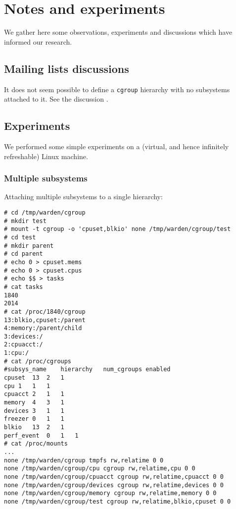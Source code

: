 \documentclass[a4paper,twoside,12pt]{article}
\begin{document}
\section{Notes and experiments}
\label{sec:notes}

We gather here some observations, experiments and discussions which have informed our research.

\subsection{Mailing lists discussions}

It does not seem possible to define a \texttt{cgroup} hierarchy with no subsystems attached to it.
See the discussion \cite{noop}.

\subsection{Experiments}
\label{sec:experiments}
We performed some simple experiments on a (virtual, and hence infinitely refreshable) Linux machine.

\subsubsection{Multiple subsystems}

Attaching multiple subsystems to a single hierarchy:
{\scriptsize \begin{verbatim}
# cd /tmp/warden/cgroup
# mkdir test
# mount -t cgroup -o 'cpuset,blkio' none /tmp/warden/cgroup/test
# cd test
# mkdir parent
# cd parent
# echo 0 > cpuset.mems
# echo 0 > cpuset.cpus
# echo $$ > tasks
# cat tasks
1840
2014
# cat /proc/1840/cgroup
13:blkio,cpuset:/parent
4:memory:/parent/child
3:devices:/
2:cpuacct:/
1:cpu:/
# cat /proc/cgroups
#subsys_name	hierarchy	num_cgroups	enabled
cpuset	13	2	1
cpu	1	1	1
cpuacct	2	1	1
memory	4	3	1
devices	3	1	1
freezer	0	1	1
blkio	13	2	1
perf_event	0	1	1
# cat /proc/mounts
...
none /tmp/warden/cgroup tmpfs rw,relatime 0 0
none /tmp/warden/cgroup/cpu cgroup rw,relatime,cpu 0 0
none /tmp/warden/cgroup/cpuacct cgroup rw,relatime,cpuacct 0 0
none /tmp/warden/cgroup/devices cgroup rw,relatime,devices 0 0
none /tmp/warden/cgroup/memory cgroup rw,relatime,memory 0 0
none /tmp/warden/cgroup/test cgroup rw,relatime,blkio,cpuset 0 0
\end{verbatim}}
\end{document}
